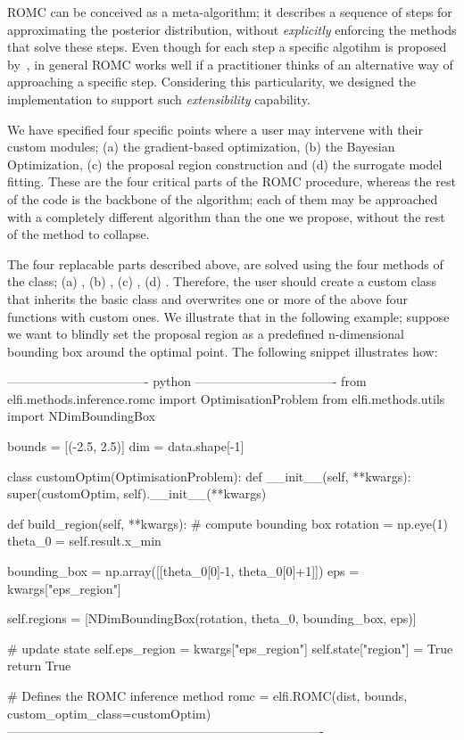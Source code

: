 ROMC can be conceived as a meta-algorithm; it describes a sequence of
steps for approximating the posterior distribution, without
\emph{explicitly} enforcing the methods that solve these steps. Even
though for each step a specific algotihm is proposed
by~\cite{Ikonomov2019}, in general ROMC works well if a practitioner
thinks of an alternative way of approaching a specific
step. Considering this particularity, we designed the implementation
to support such \emph{extensibility} capability.

We have specified four specific points where a user may intervene with
their custom modules; (a) the gradient-based optimization, (b) the
Bayesian Optimization, (c) the proposal region construction and (d)
the surrogate model fitting. These are the four critical parts of the
ROMC procedure, whereas the rest of the code is the backbone of the
algorithm; each of them may be approached with a completely different
algorithm than the one we propose, without the rest of the method to
collapse.

The four replacable parts described above, are solved using the four
methods of the \linebreak {} class; (a)
, (b) ,
\linebreak (c) , (d)
. Therefore, the user should
create a custom class that inherits the basic
 class and overwrites one or more of the
above four functions with custom ones. We illustrate that in the
following example; suppose we want to blindly set the proposal region
as a predefined n-dimensional bounding box around the optimal
point. The following snippet illustrates how:

\begin{Code}
---------------------------------- python ----------------------------------
from elfi.methods.inference.romc import OptimisationProblem
from elfi.methods.utils import NDimBoundingBox

bounds = [(-2.5, 2.5)]
dim = data.shape[-1]

class customOptim(OptimisationProblem):
    def __init__(self, **kwargs):
        super(customOptim, self).__init__(**kwargs)
        
    def build_region(self, **kwargs):
        # compute bounding box
        rotation = np.eye(1)
        theta_0 = self.result.x_min
        
        bounding_box = np.array([[theta_0[0]-1, theta_0[0]+1]])
        eps = kwargs["eps_region"]
        
        self.regions = [NDimBoundingBox(rotation, theta_0, bounding_box, eps)]
        
        # update state
        self.eps_region = kwargs["eps_region"]
        self.state["region"] = True
        return True

# Defines the ROMC inference method
romc = elfi.ROMC(dist, bounds, custom_optim_class=customOptim)
----------------------------------------------------------------------------    
\end{Code}

